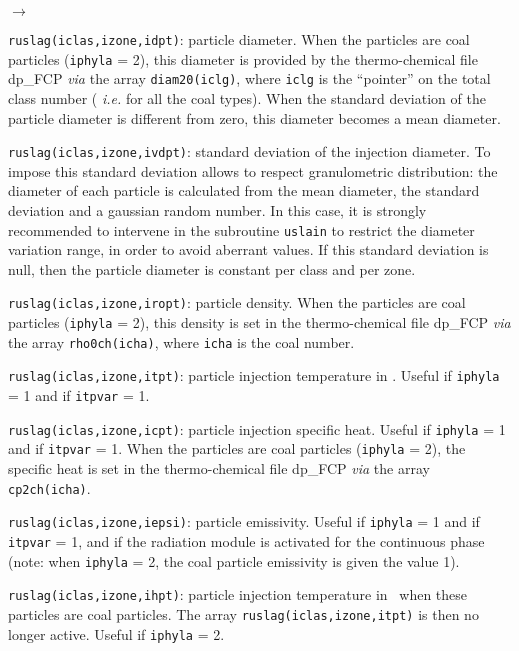{{{{\begin{list}{$\rightarrow$}{}
\item \texttt{ruslag(iclas,izone,idpt)}: particle diameter. When the particles
      are coal particles (\texttt{iphyla} = 2), this diameter is provided by the
      thermo-chemical file dp\_FCP {\it via} the array \texttt{diam20(iclg)},
      where \texttt{iclg} is the ``pointer'' on the total class number ({\em
      i.e.} for all the coal types). When the standard deviation of the
      particle diameter is different from zero, this diameter becomes a
      mean diameter.

\item \texttt{ruslag(iclas,izone,ivdpt)}: standard deviation of the injection
      diameter. To impose this standard deviation allows to respect
      granulometric distribution: the diameter of each particle is
      calculated from the mean diameter, the standard deviation and a
      gaussian random number. In this case, it is strongly recommended
      to intervene in the subroutine \texttt{uslain} to
      restrict the diameter variation range, in order to avoid
      aberrant values. If this standard deviation is null, then the
      particle diameter is constant per class and per zone.

\item \texttt{ruslag(iclas,izone,iropt)}: particle density. When the particles
      are coal particles (\texttt{iphyla} = 2), this density is set in the
      thermo-chemical file dp\_FCP {\em via} the array \texttt{rho0ch(icha)},
      where \texttt{icha} is the coal number.

\item \texttt{ruslag(iclas,izone,itpt)}: particle injection temperature in
      \degresC. Useful if \texttt{iphyla} = 1 and if \texttt{itpvar} = 1.

\item \texttt{ruslag(iclas,izone,icpt)}: particle injection specific heat. Useful
      if \texttt{iphyla} = 1 and if \texttt{itpvar} = 1. When the particles are coal
      particles (\texttt{iphyla} = 2), the specific heat is set in the
      thermo-chemical file dp\_FCP {\em via} the array \texttt{cp2ch(icha)}.

\item \texttt{ruslag(iclas,izone,iepsi)}: particle emissivity. Useful if
      \texttt{iphyla} = 1 and if \texttt{itpvar} = 1, and if the radiation
      module is activated for the continuous phase (note: when \texttt{iphyla} = 2,
      the coal particle emissivity is given the value 1).

\item \texttt{ruslag(iclas,izone,ihpt)}: particle injection temperature in
      \degresC\ when these particles are coal
      particles. The array \texttt{ruslag(iclas,izone,itpt)} is then no longer
      active. Useful if \texttt{iphyla} = 2.


\end{list}}}}}
